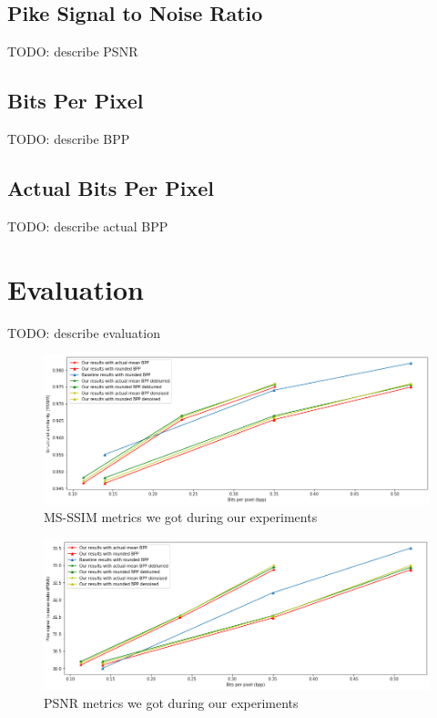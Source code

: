 \subsection{Pike Signal to Noise Ratio}

TODO: describe PSNR

\subsection{Bits Per Pixel}

TODO: describe BPP

\subsection{Actual Bits Per Pixel}

TODO: describe actual BPP

\section{Evaluation}

TODO: describe evaluation

\begin{figure}[!ht]
    \centering
    \includegraphics[width=\textwidth]{figure/mssim.png}
    \caption{MS-SSIM metrics we got during our experiments}
    \label{mssim}
\end{figure}

\begin{figure}[!ht]
    \centering
    \includegraphics[width=\textwidth]{figure/psnr.png}
    \caption{PSNR metrics we got during our experiments}
    \label{psnr}
\end{figure}

